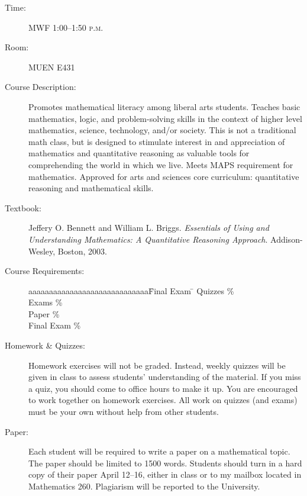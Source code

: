 \documentclass[11pt]{article}
\newcommand{\PM}{\textsc{p.m.}}
\newcommand{\book}[1]{\textit{#1}}
\begin{document}
\begin{description}
\item[Time:] MWF 1:00--1:50 \PM

\item[Room:] MUEN E431

\item[Course Description:]
Promotes mathematical literacy among liberal arts students. Teaches basic mathematics, logic, and problem-solving skills in the context of higher level mathematics, science, technology, and/or society. This is not a traditional math class, but is designed to stimulate interest in and appreciation of mathematics and quantitative reasoning as valuable tools for comprehending the world in which we live. Meets MAPS requirement for mathematics. Approved for arts and sciences core curriculum: quantitative reasoning and mathematical skills.

\item[Textbook: ]
Jeffery O. Bennett and William L. Briggs. \book{Essentials of Using and Understanding Mathematics: A Quantitative Reasoning Approach}. Addison-Wesley, Boston, 2003.

\item[Course Requirements: ]
\begin{tabbing}
aaaaaaaaaaaaaaaaaaaaaaaaaaaaa\quad    \=Final Exam \quad  \=    \kill
\> Quizzes  \%    \\
\> Exams  \% \\
\> Paper   \% \\
\> Final Exam \% \\ 
\end{tabbing}

\vspace{-0.18 in}


\item[Homework \& Quizzes: ]
Homework exercises will not be graded. Instead, weekly quizzes will be given in class to assess students' understanding of the material. If you miss a quiz, you should come to office hours to make it up. You are encouraged to work together on homework exercises. All work on quizzes (and exams) must be your own without help from other students.

\item[Paper: ]
Each student will be required to write a paper on a mathematical topic. The paper should be limited to 1500 words. Students should turn in a hard copy of their paper April 12--16, either in class or to my mailbox located in Mathematics 260. Plagiarism will be reported to the University.


\end{description}
\end{document}
